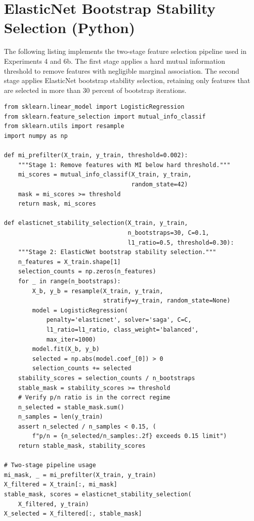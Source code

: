 
\section{ElasticNet Bootstrap Stability Selection (Python)}

The following listing implements the two-stage feature selection pipeline used in Experiments 4 and 6b. The first stage applies a hard mutual information threshold to remove features with negligible marginal association. The second stage applies ElasticNet bootstrap stability selection, retaining only features that are selected in more than 30 percent of bootstrap iterations.

\begin{verbatim}
from sklearn.linear_model import LogisticRegression
from sklearn.feature_selection import mutual_info_classif
from sklearn.utils import resample
import numpy as np

def mi_prefilter(X_train, y_train, threshold=0.002):
    """Stage 1: Remove features with MI below hard threshold."""
    mi_scores = mutual_info_classif(X_train, y_train,
                                    random_state=42)
    mask = mi_scores >= threshold
    return mask, mi_scores

def elasticnet_stability_selection(X_train, y_train,
                                   n_bootstraps=30, C=0.1,
                                   l1_ratio=0.5, threshold=0.30):
    """Stage 2: ElasticNet bootstrap stability selection."""
    n_features = X_train.shape[1]
    selection_counts = np.zeros(n_features)
    for _ in range(n_bootstraps):
        X_b, y_b = resample(X_train, y_train,
                            stratify=y_train, random_state=None)
        model = LogisticRegression(
            penalty='elasticnet', solver='saga', C=C,
            l1_ratio=l1_ratio, class_weight='balanced',
            max_iter=1000)
        model.fit(X_b, y_b)
        selected = np.abs(model.coef_[0]) > 0
        selection_counts += selected
    stability_scores = selection_counts / n_bootstraps
    stable_mask = stability_scores >= threshold
    # Verify p/n ratio is in the correct regime
    n_selected = stable_mask.sum()
    n_samples = len(y_train)
    assert n_selected / n_samples < 0.15, (
        f"p/n = {n_selected/n_samples:.2f} exceeds 0.15 limit")
    return stable_mask, stability_scores

# Two-stage pipeline usage
mi_mask, _ = mi_prefilter(X_train, y_train)
X_filtered = X_train[:, mi_mask]
stable_mask, scores = elasticnet_stability_selection(
    X_filtered, y_train)
X_selected = X_filtered[:, stable_mask]
\end{verbatim}

